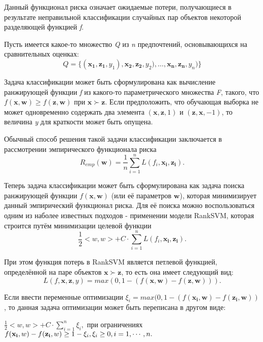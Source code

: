 \documentclass[12pt,a4paper,oneside]{article}
\begin{document}
\begin{multicols}{2}
\par

Данный функционал риска означает ожидаемые потери, получающиеся в результате неправильной классификации случайных пар объектов некоторой разделяющей функцией \emph{f}. 

\par
Пусть имеется какое-то множество \emph{Q} из \emph{n} предпочтений, основывающихся на сравнительных оценках:
\[
Q = \{(\mathbf{x_1}, \mathbf{z_1}, y_1), \mathbf{x_2}, \mathbf{z_2}, y_2), \dots, \mathbf{x_n}, \mathbf{z_n}, y_n)\}
\]

\par
Задача классификации может быть сформулирована как вычисление ранжирующей функции \emph{f} из какого-то параметрического множества \emph{F}, такого, что \(f(\mathbf{x}, \mathbf{w}) \geq f(\mathbf{z}, \mathbf{w})\) при \(\mathbf{x} \succ \mathbf{z}\). 
Если предположить, что обучающая выборка не может одновременно содержать два элемента \((\mathbf{x}, \mathbf{z}, 1)\) и \((\mathbf{z}, \mathbf{x}, -1)\), то величина \emph{y} для краткости может быть опущена. 

\par
Обычный способ решения такой задачи классификации заключается в рассмотрении эмпирического функционала риска
\[
R_{emp}(\mathbf{w}) = \frac{1}{n} \sum \limits_{i=1}^n L(f_i, \mathbf{x_i}, \mathbf{z_i}).
\]

Теперь задача классификации может быть сформулирована как задача поиска ранжирующей функции \(f(\mathbf{x}, \mathbf{w})\) (или её параметров \(\mathbf{w}\)), которая минимизирует данный эмпирический функционал риска. Для её поиска можно воспользоваться одним из наболее известных подходов - применении модели RankSVM, которая строится путём минимизации целевой функции 
\[
\frac{1}{2} <w, w> + C \cdot \sum \limits_{i=1}^n L(f_i, \mathbf{x_i}, \mathbf{z_i}).
\] 

При этом функция потерь в RankSVM является петлевой функцией, определённой на паре объектов \(\mathbf{x} \succ \mathbf{z}\), то есть она имеет следующий вид:
\[
L(f, \mathbf{x}, \mathbf{z}, y) = max(0, 1 - (f(\mathbf{x}, \mathbf{w}) - f(\mathbf{z}, \mathbf{w}))).
\]

Если ввести переменные оптимизации \(\xi_i = max(0, 1 - (f(\mathbf{x_i}, \mathbf{w}) - f(\mathbf{z_i}, \mathbf{w}))\), то данная задача оптимизации может быть переписана в другом виде:
\begin{center}
\(\frac{1}{2}<w, w> + C \cdot \sum \limits_{i=1}^n \xi_i,\) при ограничениях \\
\(f(\mathbf{x_i}, w) - f(\mathbf{z_i}, w) \geq 1 - \xi_i, \\
\xi_i \geq 0, i = 1, \cdots, n.\)
\end{center}


\end{multicols}
\end{document}
